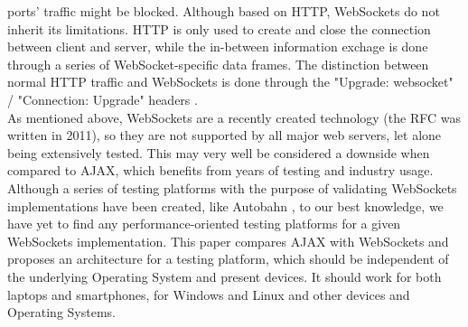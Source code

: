 \documentclass[conference]{IEEEtran}
\begin{document}
ports' traffic might be blocked. Although based on HTTP, WebSockets do not
inherit its limitations. HTTP is only used to create and close the connection
between client and server, while the in-between information exchage is done
through a series of WebSocket-specific data frames. The distinction between
normal HTTP traffic and WebSockets is done through the "Upgrade: websocket" /
"Connection: Upgrade" headers \cite{RFC}.
\\
\indent
As mentioned above, WebSockets are a recently created technology 
(the RFC was written in 2011), so they are not supported by all major
web servers, let alone being extensively tested. This may
very well be considered a downside when compared to AJAX, which benefits from
years of testing and industry usage. Although a series of testing platforms
with the purpose of validating WebSockets implementations have been created,
like Autobahn \cite{Autobahn}, to our best knowledge, we have yet to find any
performance-oriented testing platforms for a given WebSockets implementation.
This paper compares AJAX with WebSockets and proposes an architecture for
a testing platform, which should be independent of the underlying Operating
System and present devices. It should work for both laptops and smartphones,
for Windows and Linux and other devices and Operating Systems.
\end{document}
